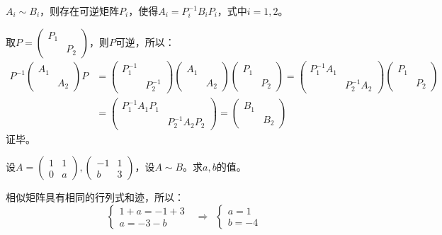 \documentclass[a4paper]{report}
\begin{document}
\begin{zhengming}
$A_i\sim B_i$，则存在可逆矩阵$P_i$，使得$A_i=P_i^{-1}B_iP_i$，式中$i=1,2$。

取$
P=
\begin{pmatrix}
P_1\\
&P_2
\end{pmatrix}
$，则$P$可逆，所以：
\begin{align*}
P^{-1}\begin{pmatrix}
A_1\\
&A_2
\end{pmatrix}P&=
\begin{pmatrix}
P_1^{-1}\\
&P_2^{-1}
\end{pmatrix}\begin{pmatrix}
A_1\\
&A_2
\end{pmatrix}\begin{pmatrix}
P_1\\
&P_2
\end{pmatrix}=
\begin{pmatrix}
P_1^{-1}A_1\\
&P_2^{-1}A_2
\end{pmatrix}\begin{pmatrix}
P_1\\
&P_2
\end{pmatrix}\\&=\begin{pmatrix}
P_1^{-1}A_1P_1\\
&P_2^{-1}A_2P_2
\end{pmatrix}=\begin{pmatrix}
B_1\\
&B_2
\end{pmatrix}
\end{align*}
证毕。
\end{zhengming}

\EX 设$A=
\begin{pmatrix}
1&1\\0&a
\end{pmatrix},\begin{pmatrix}
-1&1\\b&3
\end{pmatrix}
$，设$A\sim B$。求$a,b$的值。

\begin{jie}
相似矩阵具有相同的行列式和迹，所以：
\begin{equation*}
\begin{cases}
1+a=-1+3\\
a=-3-b
\end{cases}~~~\Rightarrow~~
\begin{cases}
a=1\\ b=-4
\end{cases}
\end{equation*}
\end{jie}
\end{document}
